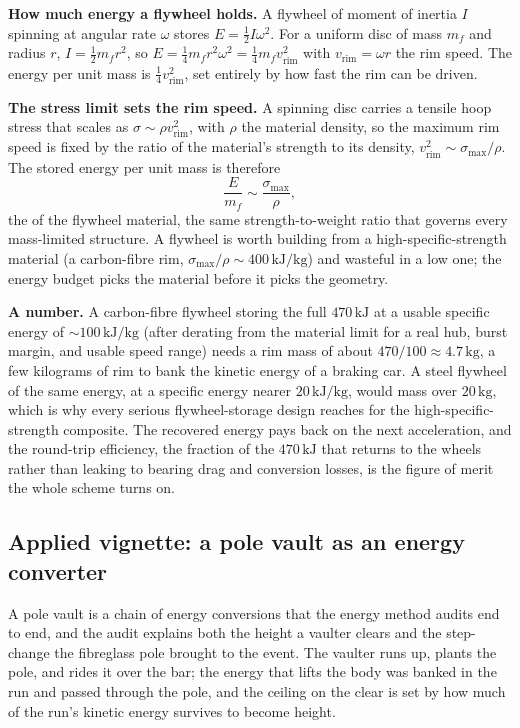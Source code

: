 \textbf{How much energy a flywheel holds.} A flywheel of moment of inertia $I$
spinning at angular rate $\omega$ stores $E = \tfrac12 I\omega^2$. For a
uniform disc of mass $m_f$ and radius $r$, $I = \tfrac12 m_f r^2$, so $E =
\tfrac14 m_f r^2\omega^2 = \tfrac14 m_f v_\text{rim}^2$ with $v_\text{rim} =
\omega r$ the rim speed. The energy per unit mass is $\tfrac14 v_\text{rim}^2$,
set entirely by how fast the rim can be driven.

\textbf{The stress limit sets the rim speed.} A spinning disc carries a
tensile hoop stress that scales as $\sigma \sim \rho v_\text{rim}^2$, with
$\rho$ the material density, so the maximum rim speed is fixed by the ratio of
the material's strength to its density, $v_\text{rim}^2 \sim \sigma_\text{max}
/\rho$. The stored energy per unit mass is therefore
\[
\frac{E}{m_f}\sim \frac{\sigma_\text{max}}{\rho},
\]
the  of the flywheel material, the same
strength-to-weight ratio that governs every mass-limited structure. A flywheel
is worth building from a high-specific-strength material (a carbon-fibre rim,
$\sigma_\text{max}/\rho \sim 400\,\si{\kilo\joule\per\kilogram}$) and wasteful
in a low one; the energy budget picks the material before it picks the
geometry.

\textbf{A number.} A carbon-fibre flywheel storing the full $470\,\si{\kilo
\joule}$ at a usable specific energy of $\sim 100\,\si{\kilo\joule\per
\kilogram}$ (after derating from the material limit for a real hub, burst
margin, and usable speed range) needs a rim mass of about
$470/100 \approx 4.7\,\si{\kilogram}$, a few kilograms of rim to bank the
kinetic energy of a braking car. A steel flywheel of the same energy, at a
specific energy nearer $20\,\si{\kilo\joule\per\kilogram}$, would mass over
$20\,\si{\kilogram}$, which is why every serious flywheel-storage design
reaches for the high-specific-strength composite. The recovered energy pays
back on the next acceleration, and the round-trip efficiency, the fraction of
the $470\,\si{\kilo\joule}$ that returns to the wheels rather than leaking to
bearing drag and conversion losses, is the figure of merit the whole scheme
turns on.

\subsection{Applied vignette: a pole vault as an energy converter}

A pole vault is a chain of energy conversions that the energy method audits
end to end, and the audit explains both the height a vaulter clears and the
step-change the fibreglass pole brought to the event. The vaulter runs up,
plants the pole, and rides it over the bar; the energy that lifts the body
was banked in the run and passed through the pole, and the ceiling on the
clear is set by how much of the run's kinetic energy survives to become
height.


